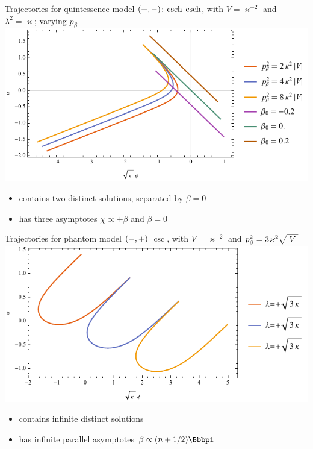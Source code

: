 \documentclass[8pt]{beamer}
\begin{document}
\begin{frame}%
{Trajectories for quintessence model ${\left(+,-\right)}$: $\operatorname{csch}$}%
{$\operatorname{csch}$, with $V = \varkappa^{-2}$ and
$\lambda^2 = \varkappa$; varying $p_\beta$}
\includegraphics[width=\textwidth]{../plots.nb/csch_pbet_l.pdf}
\begin{itemize}
	\item contains two distinct solutions, separated by $\beta = 0$
	\item has three asymptotes $\chi \propto \pm \beta$ and $\beta = 0$
\end{itemize}
\end{frame}

\begin{frame}%
{Trajectories for phantom model ${\left(-,+\right)}$}%
{$\csc$, with $V = \varkappa^{-2}$ and
$p_\beta^2 = 3\varkappa^2\sqrt{{\left|V\right|}}$}
\includegraphics[width=\textwidth]{../plots.nb/csc_lamb_l.pdf}
\begin{itemize}
	\item contains infinite distinct solutions
	\item has infinite parallel asymptotes $\beta \propto \rbr{n+1/2}\pp $
\end{itemize}
\end{frame}
\end{document}
